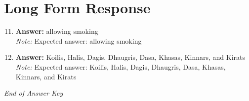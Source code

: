 \documentclass[12pt]{article}
\begin{document}
\section*{Long Form Response}
\begin{enumerate}[label=\arabic*.]
\setcounter{enumi}{10}
\item \textbf{Answer:} allowing smoking
\\ \textit{Note:} Expected answer: allowing smoking
\item \textbf{Answer:} Koilis, Halis, Dagis, Dhaugris, Dasa, Khasas, Kinnars, and Kirats
\\ \textit{Note:} Expected answer: Koilis, Halis, Dagis, Dhaugris, Dasa, Khasas, Kinnars, and Kirats
\end{enumerate}

\vfill
\noindent\textit{End of Answer Key}
\end{document}
